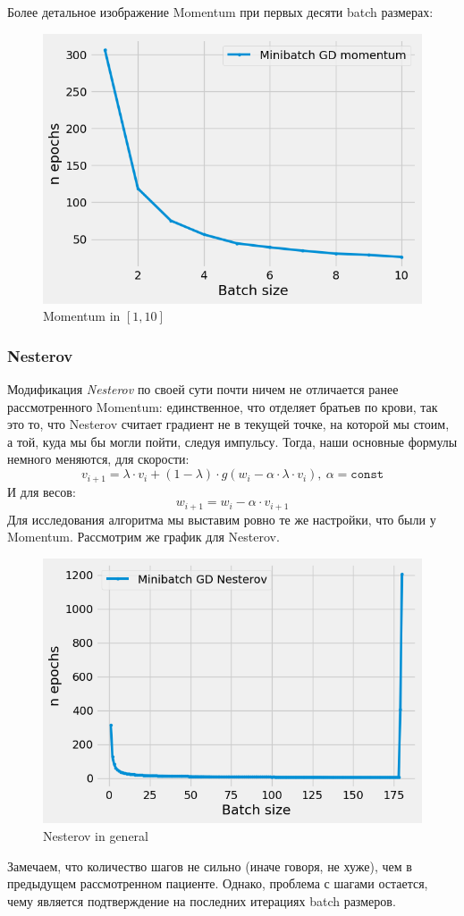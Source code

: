 \documentclass[12pt, a4paper, oneside, final]{article}
\begin{document}
	Более детальное изображение Momentum при первых десяти batch размерах:
	\begin{figure}[H]
		\centering
		\includegraphics[scale = 0.78]{Image/T3_MOMENTUM_1_10.png}
		\caption*{Momentum in $[1, 10]$}
	\end{figure}
	\subsubsection*{Nesterov}
	Модификация \textit{Nesterov} по своей сути почти ничем не отличается ранее рассмотренного Momentum: единственное, что отделяет братьев по крови, так это то, что Nesterov считает градиент не в текущей точке, на которой мы стоим, а той, куда мы бы могли пойти, следуя импульсу.
	Тогда, наши основные формулы немного меняются, для скорости:
	\[
		v_{i + 1} = \lambda \cdot v_{i} + (1 - \lambda) \cdot g(w_{i} - \alpha \cdot \lambda \cdot v_{i}), ~ \alpha = \mathtt{const}
	\]
	И для весов:
	\[
		w_{i + 1} = w_{i} - \alpha \cdot v_{i + 1}
	\]
	Для исследования алгоритма мы выставим ровно те же настройки, что были у Momentum.
	Рассмотрим же график для Nesterov.
	\begin{figure}[H]
		\centering
		\includegraphics[scale = 0.78]{Image/T3_NESTEROV_GENERAL.png}
		\caption*{Nesterov in general}
	\end{figure}
	Замечаем, что количество шагов не сильно (иначе говоря, не хуже), чем в предыдущем рассмотренном пациенте.
	Однако, проблема с шагами остается, чему является подтверждение на последних итерациях batch размеров.
\end{document}
